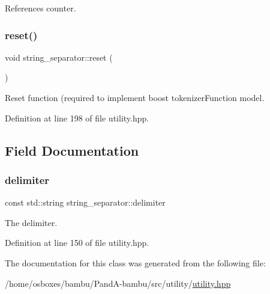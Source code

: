 References counter.

\mbox{\label{classstring__separator_aae8603394fe99c8426623e899f334c4d}} 
\subsubsection{\texorpdfstring{reset()}{reset()}}
{\footnotesize\ttfamily void string\+\_\+separator\+::reset (\begin{DoxyParamCaption}{ }\end{DoxyParamCaption})\hspace{0.3cm}{\ttfamily [inline]}}



Reset function (required to implement boost tokenizer\+Function model. 



Definition at line 198 of file utility.\+hpp.



\subsection{Field Documentation}
\mbox{\label{classstring__separator_afaeeb0c2ca4249ec4a7a7f2bfcb971cf}} 
\subsubsection{\texorpdfstring{delimiter}{delimiter}}
{\footnotesize\ttfamily const std\+::string string\+\_\+separator\+::delimiter\hspace{0.3cm}{\ttfamily [private]}}



The delimiter. 



Definition at line 150 of file utility.\+hpp.



The documentation for this class was generated from the following file\+:\begin{DoxyCompactItemize}
\item 
/home/osboxes/bambu/\+Pand\+A-\/bambu/src/utility/\hyperlink{utility_8hpp}{utility.\+hpp}\end{DoxyCompactItemize}
